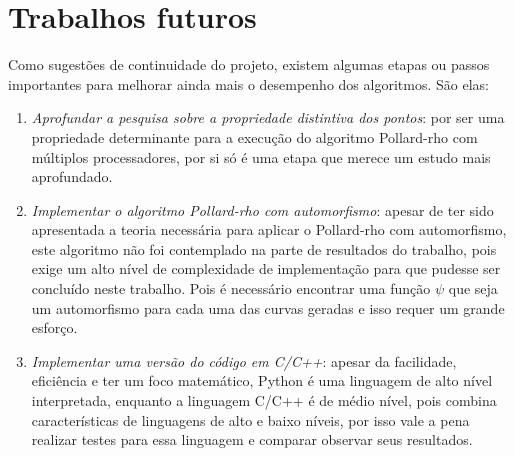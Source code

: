 \section{Trabalhos futuros}
Como sugestões de continuidade do projeto, existem algumas etapas ou passos importantes para melhorar ainda mais o desempenho dos algoritmos. São elas:

\begin{enumerate}
	\item \textit{Aprofundar a pesquisa sobre a propriedade distintiva dos pontos}: por ser uma propriedade determinante para a execução do algoritmo Pollard-rho com múltiplos processadores, por si só é uma etapa que merece um estudo mais aprofundado.
	\item \textit{Implementar o algoritmo Pollard-rho com automorfismo}: apesar de ter sido apresentada a teoria necessária para aplicar o Pollard-rho com automorfismo, este algoritmo não foi contemplado na parte de resultados do trabalho, pois exige um alto nível de complexidade de implementação para que pudesse ser concluído neste trabalho. Pois é necessário encontrar uma função \(\psi\) que seja um automorfismo para cada uma das curvas geradas e isso requer um grande esforço.
	\item \textit{Implementar uma versão do código em C/C++}: apesar da facilidade, eficiência e ter um foco matemático, Python é uma linguagem de alto nível interpretada, enquanto a linguagem C/C++ é de médio nível, pois combina características de linguagens de alto e baixo níveis, por isso vale a pena realizar testes para essa linguagem e comparar observar seus resultados.
\end{enumerate}

